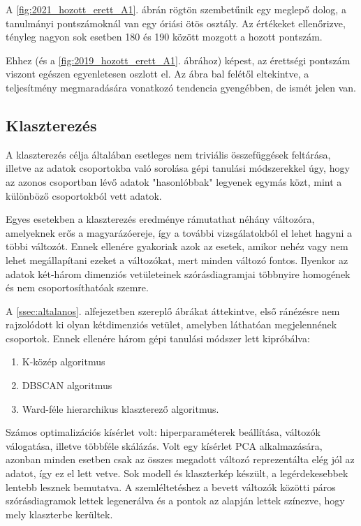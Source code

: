 \documentclass[12pt]{article}
\begin{document}
A \ref{fig:2021_hozott_erett_A1}. ábrán rögtön szembetűnik egy meglepő dolog, a tanulmányi pontszámoknál van egy óriási ötös osztály. Az értékeket ellenőrizve, tényleg nagyon sok esetben 180 és 190 között mozgott a hozott pontszám.

Ehhez (és a \ref{fig:2019_hozott_erett_A1}. ábrához) képest, az érettségi pontszám viszont egészen egyenletesen oszlott el. Az ábra bal felétől eltekintve, a teljesítmény megmaradására vonatkozó tendencia gyengébben, de ismét jelen van.


\subsection{Klaszterezés}

A klaszterezés célja általában esetleges nem triviális összefüggések feltárása, illetve az adatok csoportokba való sorolása gépi tanulási módszerekkel úgy, hogy az azonos csoportban lévő adatok "hasonlóbbak" legyenek egymás közt, mint a különböző csoportokból vett adatok.

Egyes esetekben a klaszterezés eredménye rámutathat néhány változóra, amelyeknek erős a magyarázóereje, így a további vizsgálatokból el lehet hagyni a többi változót. Ennek ellenére gyakoriak azok az esetek, amikor nehéz vagy nem lehet megállapítani ezeket a változókat, mert minden változó fontos. Ilyenkor az adatok két-három dimenziós vetületeinek szórásdiagramjai többnyire homogének és nem csoportosíthatóak szemre.

A \ref{ssec:altalanos}. alfejezetben szereplő ábrákat áttekintve, első ránézésre nem rajzolódott ki olyan kétdimenziós vetület, amelyben láthatóan megjelennének csoportok. Ennek ellenére három gépi tanulási módszer lett kipróbálva:
\begin{enumerate}
\item K-közép algoritmus
\item DBSCAN algoritmus
\item Ward-féle hierarchikus klaszterező algoritmus.
\end{enumerate}

Számos optimalizációs kísérlet volt: hiperparaméterek beállítása, változók válogatása, illetve többféle skálázás. Volt egy kísérlet PCA alkalmazására, azonban minden esetben csak az összes megadott változó reprezentálta elég jól az adatot, így ez el lett vetve. Sok modell és klaszterkép készült, a legérdekesebbek lentebb lesznek bemutatva. A szemléltetéshez a bevett változók közötti páros szórásdiagramok lettek legenerálva és a pontok az alapján lettek színezve, hogy mely klaszterbe kerültek.
\end{document}
